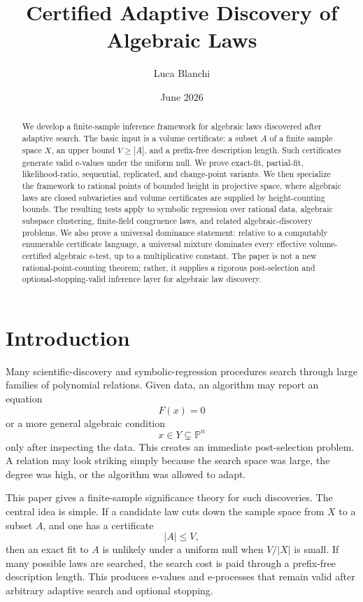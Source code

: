 \documentclass[11pt]{article}
\title{Certified Adaptive Discovery of Algebraic Laws}
\author{Luca Blanchi}
\date{June 2026}
\begin{document}
\maketitle

\begin{abstract}
We develop a finite-sample inference framework for algebraic laws discovered after adaptive search. The basic input is a volume certificate: a subset $A$ of a finite sample space $X$, an upper bound $V\ge |A|$, and a prefix-free description length. Such certificates generate valid e-values under the uniform null. We prove exact-fit, partial-fit, likelihood-ratio, sequential, replicated, and change-point variants. We then specialize the framework to rational points of bounded height in projective space, where algebraic laws are closed subvarieties and volume certificates are supplied by height-counting bounds. The resulting tests apply to symbolic regression over rational data, algebraic subspace clustering, finite-field congruence laws, and related algebraic-discovery problems. We also prove a universal dominance statement: relative to a computably enumerable certificate language, a universal mixture dominates every effective volume-certified algebraic e-test, up to a multiplicative constant. The paper is not a new rational-point-counting theorem; rather, it supplies a rigorous post-selection and optional-stopping-valid inference layer for algebraic law discovery.
\end{abstract}

\section{Introduction}

Many scientific-discovery and symbolic-regression procedures search through large families of polynomial relations. Given data, an algorithm may report an equation
\[
F(x)=0
\]
or a more general algebraic condition
\[
x\in Y\subsetneq \mathbb P^n
\]
only after inspecting the data. This creates an immediate post-selection problem. A relation may look striking simply because the search space was large, the degree was high, or the algorithm was allowed to adapt.

This paper gives a finite-sample significance theory for such discoveries. The central idea is simple. If a candidate law cuts down the sample space from $X$ to a subset $A$, and one has a certificate
\[
|A|\le V,
\]
then an exact fit to $A$ is unlikely under a uniform null when $V/|X|$ is small. If many possible laws are searched, the search cost is paid through a prefix-free description length. This produces e-values and e-processes that remain valid after arbitrary adaptive search and optional stopping.
\end{document}
